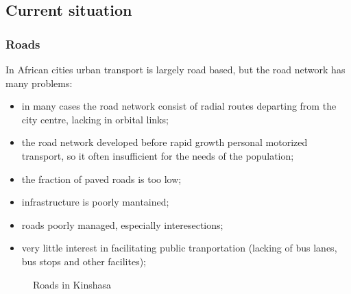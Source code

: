\documentclass{article}
\begin{document}
\subsection{Current situation}
\subsubsection{Roads}
In African cities urban transport is largely road based, but the road network has many problems: \cite{africatransport}
\begin{itemize}
\item{in many cases the road network consist of radial routes departing from the city centre, lacking in orbital links;}
\item{the road network developed before rapid growth personal motorized transport, so it often insufficient for the needs of the population;}
\item{the fraction of paved roads is too low;}
\item{infrastructure is poorly mantained;}
\item{roads poorly managed, especially interesections;}
\item{very little interest in facilitating public tranportation (lacking of bus lanes, bus stops and other facilites);}
\end{itemize}

\begin{figure}[H]
\qquad
{}
\caption{Roads in Kinshasa}
\end{figure}

\end{document}
